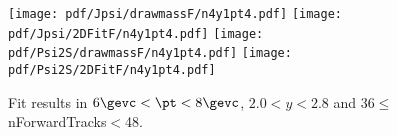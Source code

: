 \begin{figure}[H]
\begin{center}
\texttt{[image: pdf/Jpsi/drawmassF/n4y1pt4.pdf]}
\texttt{[image: pdf/Jpsi/2DFitF/n4y1pt4.pdf]}
\vspace*{-0.5cm}
\texttt{[image: pdf/Psi2S/drawmassF/n4y1pt4.pdf]}
\texttt{[image: pdf/Psi2S/2DFitF/n4y1pt4.pdf]}
\vspace*{-0.5cm}
\end{center}
\caption{Fit results in $6\gevc<\pt<8\gevc$, $2.0<y<2.8$ and 36$\leq$nForwardTracks$<$48.}
\label{Fitn4y1pt4}
\end{figure}

